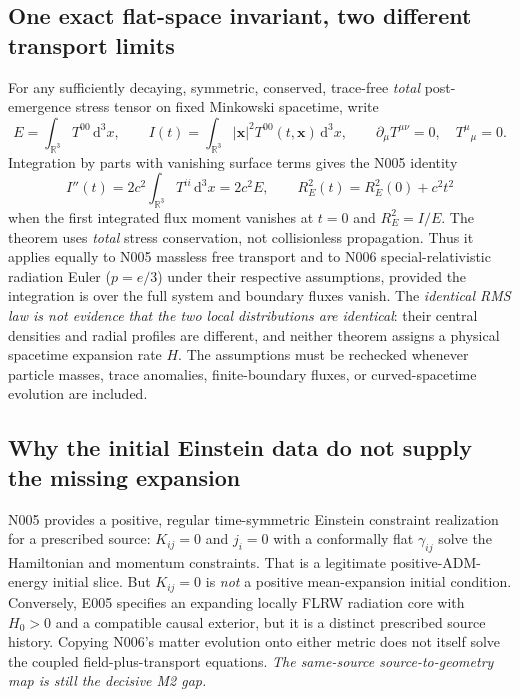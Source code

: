 \documentclass[11pt,a4paper]{article}
\newcommand{\dd}{\mathrm{d}}
\theoremstyle{tmon}
\theoremstyle{definition}
\begin{document}
\subsection{One exact flat-space invariant, two different transport limits}
For any sufficiently decaying, symmetric, conserved, trace-free \emph{total} post-emergence stress tensor on fixed Minkowski spacetime, write
\begin{equation}
 E=\int_{\mathbb R^3}T^{00}\,\dd^3x,\qquad
 I(t)=\int_{\mathbb R^3}|\boldsymbol{x}|^2 T^{00}(t,\boldsymbol{x})\,\dd^3x,
 \qquad \partial_\mu T^{\mu\nu}=0,\quad T^\mu{}_\mu=0.
\end{equation}
Integration by parts with vanishing surface terms gives the N005 identity
\begin{equation}
 I''(t)=2c^2\int_{\mathbb R^3}T^{ii}\,\dd^3x=2c^2E,\qquad
 R_E^2(t)=R_E^2(0)+c^2t^2
 \label{eq:integration-virial}
\end{equation}
when the first integrated flux moment vanishes at $t=0$ and $R_E^2=I/E$. The theorem uses \emph{total} stress conservation, not collisionless propagation. Thus it applies equally to N005 massless free transport and to N006 special-relativistic radiation Euler ($p=e/3$) under their respective assumptions, provided the integration is over the full system and boundary fluxes vanish. The \emph{identical RMS law is not evidence that the two local distributions are identical}: their central densities and radial profiles are different, and neither theorem assigns a physical spacetime expansion rate $H$. The assumptions must be rechecked whenever particle masses, trace anomalies, finite-boundary fluxes, or curved-spacetime evolution are included.

\subsection{Why the initial Einstein data do not supply the missing expansion}
N005 provides a positive, regular time-symmetric Einstein constraint realization for a prescribed source: $K_{ij}=0$ and $j_i=0$ with a conformally flat $\gamma_{ij}$ solve the Hamiltonian and momentum constraints. That is a legitimate positive-ADM-energy initial slice. But $K_{ij}=0$ is \emph{not} a positive mean-expansion initial condition. Conversely, E005 specifies an expanding locally FLRW radiation core with $H_0>0$ and a compatible causal exterior, but it is a distinct prescribed source history. Copying N006's matter evolution onto either metric does not itself solve the coupled field-plus-transport equations. \emph{The same-source source-to-geometry map is still the decisive M2 gap.}
\end{document}
